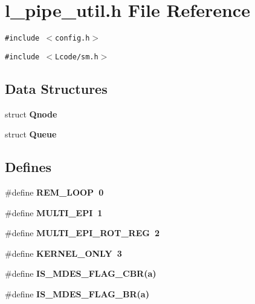\section{l\_\-pipe\_\-util.h File Reference}
\label{l__pipe__util_8h}
{\tt \#include $<$config.h$>$}\par
{\tt \#include $<$Lcode/sm.h$>$}\par
\subsection*{Data Structures}
\begin{CompactItemize}
\item 
struct \bf{Qnode}
\item 
struct \bf{Queue}
\end{CompactItemize}
\subsection*{Defines}
\begin{CompactItemize}
\item 
\#define \bf{REM\_\-LOOP}~0
\item 
\#define \bf{MULTI\_\-EPI}~1
\item 
\#define \bf{MULTI\_\-EPI\_\-ROT\_\-REG}~2
\item 
\#define \bf{KERNEL\_\-ONLY}~3
\item 
\#define \bf{IS\_\-MDES\_\-FLAG\_\-CBR}(a)
\item 
\#define \bf{IS\_\-MDES\_\-FLAG\_\-BR}(a)
\end{CompactItemize}
